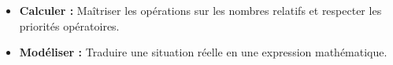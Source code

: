 \documentclass[11pt,a4paper]{article}
\begin{document}
	
	\ExamBanner
	\StudentInfoBox
	
	\begin{tcolorbox}[colback=blue!5,colframe=primary!30,arc=2mm,boxrule=0.5pt,title=\faIcon{bullseye} \textbf{Compétences dominantes}]
		\begin{itemize}[leftmargin=*,noitemsep,topsep=5pt]
			\item \textbf{Calculer :} Maîtriser les opérations sur les nombres relatifs et respecter les priorités opératoires.
			\item \textbf{Modéliser :} Traduire une situation réelle en une expression mathématique.
		\end{itemize}
	\end{tcolorbox}
	\vspace{0.5cm}
	
	
\end{document}
